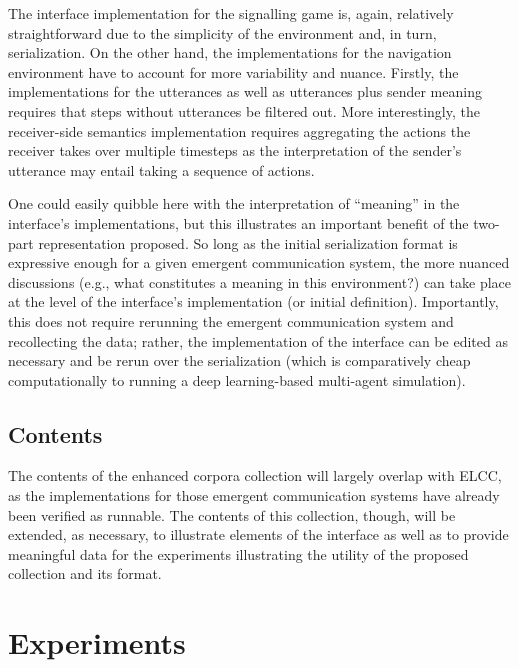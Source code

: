 The interface implementation for the signalling game is, again, relatively straightforward due to the simplicity of the environment and, in turn, serialization.
On the other hand, the implementations for the navigation environment have to account for more variability and nuance.
Firstly, the implementations for the utterances as well as utterances plus sender meaning requires that steps without utterances be filtered out.
More interestingly, the receiver-side semantics implementation requires aggregating the actions the receiver takes over multiple timesteps as the interpretation of the sender's utterance may entail taking a sequence of actions.

One could easily quibble here with the interpretation of ``meaning'' in the interface's implementations, but this illustrates an important benefit of the two-part representation proposed.
So long as the initial serialization format is expressive enough for a given emergent communication system, the more nuanced discussions (e.g., what constitutes a meaning in this environment?) can take place at the level of the interface's implementation (or initial definition).
Importantly, this does not require rerunning the emergent communication system and recollecting the data; rather, the implementation of the interface can be edited as necessary and be rerun over the serialization (which is comparatively cheap computationally to running a deep learning-based multi-agent simulation).


\subsection{Contents}
The contents of the enhanced corpora collection will largely overlap with ELCC, as the implementations for those emergent communication systems have already been verified as runnable.
The contents of this collection, though, will be extended, as necessary, to illustrate elements of the interface as well as to provide meaningful data for the experiments illustrating the utility of the proposed collection and its format.


\section{Experiments}

